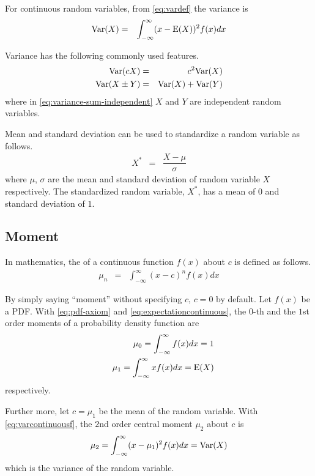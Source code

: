 For continuous random variables, from \eqref{eq:vardef} the variance is
\begin{eqnarray}
	\textup{Var}(X) &=& \int_{-\infty}^{\infty} (x-\textup{E}(X))^2f(x)dx \label{eq:varcontinuousf}
\end{eqnarray}

Variance has the following commonly used features.
\begin{eqnarray}
	\textup{Var}(cX) &=& c^2\textup{Var}(X) \nonumber \\
	\textup{Var}(X\pm Y) &=& \textup{Var}(X) + \textup{Var}(Y) \label{eq:variance-sum-independent}
\end{eqnarray}
where in \eqref{eq:variance-sum-independent} $X$ and $Y$ are independent random variables.

Mean and standard deviation can be used to standardize a random variable as follows.
\begin{eqnarray}
	X^* &=& \dfrac{X-\mu}{\sigma} \nonumber
\end{eqnarray}
where $\mu$, $\sigma$ are the mean and standard deviation of random variable $X$ respectively. The standardized random variable, $X^*$, has a mean of $0$ and standard deviation of $1$.

\subsection{Moment} \label{sec:moments}

In mathematics, the  of a continuous function $f(x)$ about $c$ is defined as follows.
\begin{eqnarray}
	\mu_n &=& \int_{-\infty}^{\infty}(x-c)^nf(x)dx \nonumber
\end{eqnarray}

By simply saying ``moment'' without specifying $c$, $c=0$ by default. Let $f(x)$ be a PDF. With \eqref{eq:pdf-axiom} and \eqref{eq:expectationcontinuous}, the $0$-th and the $1$st order moments of a probability density function are
\begin{eqnarray}
	&& \mu_0 = \int_{-\infty}^{\infty}f(x)dx = 1 \nonumber \\
	&& \mu_1 = \int_{-\infty}^{\infty}xf(x)dx = \textup{E}(X) \nonumber
\end{eqnarray}
respectively.

Further more, let $c=\mu_1$ be the mean of the random variable. With \eqref{eq:varcontinuousf}, the $2$nd order central moment $\mu_2$ about $c$ is
\begin{eqnarray}
	\mu_2 = \int_{-\infty}^{\infty}(x-\mu_1)^2f(x)dx = \textup{Var}(X) \nonumber
\end{eqnarray}
which is the variance of the random variable.

